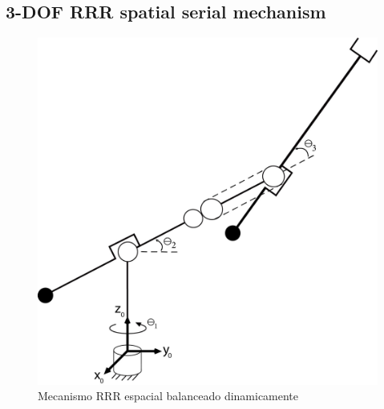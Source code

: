 \documentclass[a4paper,11pt,brazil,fleqn]{article}
\begin{document}
\subsection{3-DOF RRR spatial serial mechanism} \label{S03-2}

\begin{figure}[H]
	\centering
	\includegraphics[scale=0.11]{RRR3D.jpg}  
	\caption{Mecanismo RRR espacial balanceado dinamicamente}
	\label{fig:RRR3D}
\end{figure}
\end{document}
